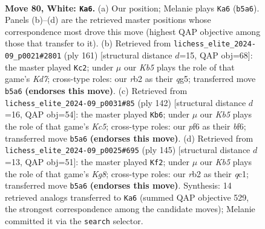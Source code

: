 \documentclass[11pt]{article}
\begin{document}
\clearpage

\begin{figure}[p]\centering
\begin{subfigure}{0.46\textwidth}\centering
\resizebox{\linewidth}{!}{%
\newchessgame
\chessboard[
  setfen={3Q4/8/5pk1/1K6/8/6P1/1r6/2q5 w - - 10 80},
  showmover=false,
  pgfstyle=straightmove, color=movearrow, markmove={b5-a6}
]}
\caption{}
\end{subfigure}\hfill
\begin{subfigure}{0.46\textwidth}\centering
\resizebox{\linewidth}{!}{%
\newchessgame
\chessboard[
  setfen={8/8/8/1q1PK1Q1/8/8/3k4/8 b - - 6 81},
  showmover=false,
  pgfstyle=straightmove, color=movearrow, markmove={d2-c2}
]}
\caption{}
\end{subfigure}
\\[4pt]
\begin{subfigure}{0.46\textwidth}\centering
\resizebox{\linewidth}{!}{%
\newchessgame
\chessboard[
  setfen={8/8/5b2/2K2k2/8/8/3q4/2r5 w - - 4 72},
  showmover=false,
  pgfstyle=straightmove, color=movearrow, markmove={c5-b6}
]}
\caption{}
\end{subfigure}\hfill
\begin{subfigure}{0.46\textwidth}\centering
\resizebox{\linewidth}{!}{%
\newchessgame
\chessboard[
  setfen={8/8/8/1PK5/8/1q6/8/2Q3k1 b - - 12 73},
  showmover=false,
  pgfstyle=straightmove, color=movearrow, markmove={g1-f2}
]}
\caption{}
\end{subfigure}
\caption{\textbf{Move 80, White: \texttt{Ka6}.} (a) Our position; Melanie plays \texttt{Ka6} (\texttt{b5a6}). Panels (b)--(d) are the retrieved master positions whose correspondence most drove this move (highest QAP objective among those that transfer to it). (b) Retrieved from \texttt{lichess\_elite\_2024-09\_p0021\#2801} (ply 161) [structural distance $d$=15, QAP obj=68]: the master played \texttt{Kc2}; under $\mu$ our \emph{Kb5} plays the role of that game's \emph{Kd7}; cross-type roles: our \emph{r}b2 as their \emph{q}g5; transferred move \texttt{b5a6} \textbf{(endorses this move)}. (c) Retrieved from \texttt{lichess\_elite\_2024-09\_p0031\#85} (ply 142) [structural distance $d$=16, QAP obj=54]: the master played \texttt{Kb6}; under $\mu$ our \emph{Kb5} plays the role of that game's \emph{Kc5}; cross-type roles: our \emph{p}f6 as their \emph{b}f6; transferred move \texttt{b5a6} \textbf{(endorses this move)}. (d) Retrieved from \texttt{lichess\_elite\_2024-09\_p0025\#695} (ply 145) [structural distance $d$=13, QAP obj=51]: the master played \texttt{Kf2}; under $\mu$ our \emph{Kb5} plays the role of that game's \emph{Kg8}; cross-type roles: our \emph{r}b2 as their \emph{q}c1; transferred move \texttt{b5a6} \textbf{(endorses this move)}. Synthesis: 14 retrieved analogs transferred to \texttt{Ka6} (summed QAP objective 529, the strongest correspondence among the candidate moves); Melanie committed it via the \texttt{search} selector.}
\label{fig:thought-m158}
\end{figure}
\end{document}
